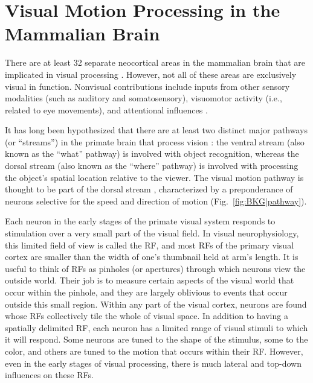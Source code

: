 

\section{Visual Motion Processing in the Mammalian Brain}
\label{sec:BKG|pathway}

There are at least 32 separate neocortical areas in the mammalian brain
that are implicated in visual processing \citep{FellemanVanEssen1991}.
However, not all of these areas are exclusively visual in function.
Nonvisual contributions include inputs from other sensory modalities
(such as auditory and somatosensory), visuomotor activity (i.e., related
to eye movements), and attentional influences \citep{FellemanVanEssen1991}.

It has long been hypothesized that there are at least two distinct major
pathways (or ``streams'') in the primate brain that process vision
\citep{UngerleiderMishkin1982,GoodaleMilner1992}:
the ventral stream (also known as the ``what'' pathway) is involved with
object recognition, whereas the dorsal stream (also known as the 
``where'' pathway) is involved with processing the object's spatial location
relative to the viewer.
The visual motion pathway is thought to be part of the dorsal stream
\citep{Britten2008,Orban2008},
characterized by a preponderance of neurons selective for the speed and
direction of motion (Fig.~\ref{fig:BKG|pathway}).

Each neuron in the early stages of the primate visual system 
responds to stimulation over a very small part of the visual field.
In visual neurophysiology, this limited field of view is called the \ac{RF},
and most \acp{RF} of the primary visual cortex are smaller than the width of one's
thumbnail held at arm's length.
It is useful to think of \acp{RF} as pinholes (or apertures) through which neurons
view the outside world. Their job is to measure certain aspects of the visual world
that occur within the pinhole, and they are largely oblivious to events that occur
outside this small region.
Within any part of the visual cortex, neurons are found whose \acp{RF} collectively
tile the whole of visual space.
In addition to having a spatially delimited \ac{RF}, 
each neuron has a limited range of visual stimuli to which it will respond.
Some neurons are tuned to the shape of the stimulus, some to the color, and others
are tuned to the motion that occurs within their \ac{RF}.
However, even in the early stages of visual processing, there is much
lateral and top-down influences on these \acp{RF}.

